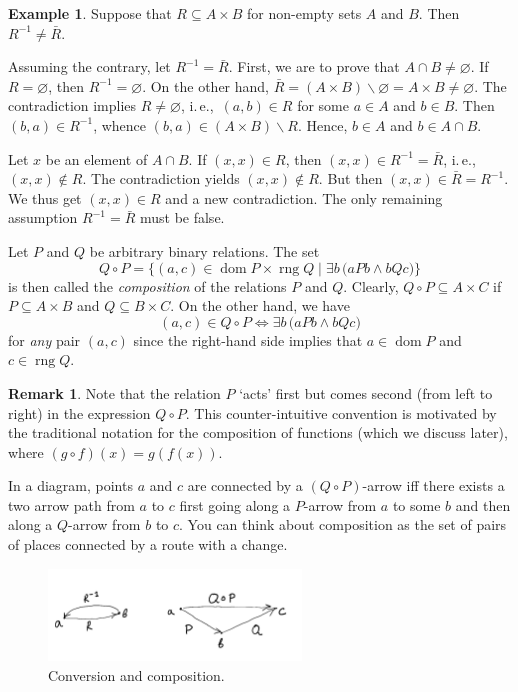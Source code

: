 \documentclass[12pt,notitlepage]{article}
\theoremstyle{plain}
\theoremstyle{definition}
\newtheorem{exm}[thm]{Example}
\newtheorem{rem}[thm]{Remark}
\theoremstyle{plain}
\newcommand{\sbs}{\subseteq}
\renewcommand{\setminus}{\smallsetminus}
\newcommand{\void}{\varnothing}
\newcommand{\dom}{\mathop{\mathrm{dom}}}
\newcommand{\rng}{\mathop{\mathrm{rng}}}
\newcommand{\1}{\mathbf{1}}
\newcommand{\0}{\mathbf{0}}
\begin{document}
\begin{exm}
Suppose that $R \sbs A \times B$ for non-empty sets $A$ and $B$. Then $R^{-1} \neq \bar R$.

Assuming the contrary, let $R^{-1} = \bar R$. First, we are to prove that $A \cap B \neq \void$.  If $R = \void$, then $R^{-1} = \void$. On the other hand, $\bar R = (A \times B) \setminus \void = A \times B \neq \void$. The contradiction implies $R \neq \void$, i.\,e.,\ $(a,b) \in R$ for some $a \in A$ and $b \in B$. Then $(b,a) \in R^{-1}$, whence $(b,a) \in (A \times B) \setminus R$. Hence, $b \in A$ and $b \in A \cap B$. 

Let $x$ be an element of $A \cap B$. If $(x,x) \in R$, then $(x,x) \in R^{-1} = \bar R$, i.\,e.,\ $(x,x) \notin R$. The contradiction yields $(x,x) \notin R$. But then $(x,x) \in \bar R = R^{-1}$. We thus get $(x,x) \in R$ and a new contradiction. The only remaining assumption $R^{-1} = \bar R$ must be false.
\end{exm}

Let $P$ and $Q$ be arbitrary binary relations. The set 
$$Q \circ P = \{(a, c) \in \dom P \times \rng Q \mid \exists b\, \bigl( a P b \wedge b Q c \bigr)\}$$
is then called the \emph{composition} of the relations $P$ and $Q$. Clearly, $Q \circ P \sbs A \times C$ if $P \sbs A \times B$ and $Q \sbs B \times C$. On the other hand, we have
$$(a,c) \in Q \circ P \iff \exists b\, \bigl( a P b \wedge b Q c \bigr)$$
for \emph{any} pair $(a, c)$ since the right-hand side implies that $a \in \dom P$ and $c \in \rng Q$.

\begin{rem}
Note that the relation $P$ `acts' first but comes second (from left to right) in the expression $Q \circ P$. This counter-intuitive convention is motivated by the traditional notation for the composition of functions (which we discuss later), where $(g \circ f)(x) = g(f(x))$.
\end{rem}

In a diagram, points $a$ and $c$ are connected by a $(Q \circ P)$-arrow iff there exists a two arrow path from $a$ to $c$ first going along a $P$-arrow from $a$ to some $b$ and then along a $Q$-arrow from $b$ to $c$. You can think about composition as the set of pairs of places connected by a route with a change.


\begin{figure}[h]
\centering
\includegraphics*[width=0.6\textwidth]{conv_comp.pdf}
\caption{Conversion and composition.}
\end{figure}
\end{document}
